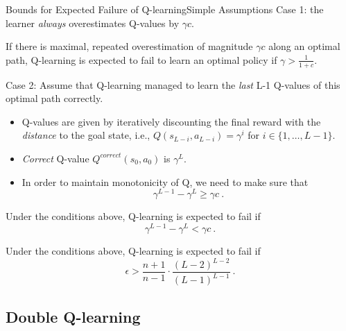 \documentclass{beamer}
\newcommand{\red}[1]{{\color{red} #1}}
\begin{document}
\begin{frame}{Bounds for Expected Failure of Q-learning}{Simple Assumptions}
Case 1: the learner \textit{always} overestimates Q-values by $\gamma c$.
\begin{Theorem}
	If there is maximal, repeated overestimation of magnitude $\gamma c$ along an optimal path, Q-learning is expected to fail to learn an optimal policy if $\gamma > \frac{1}{1+c}$.
\end{Theorem}
\end{frame}

\begin{frame}
Case 2: Assume that Q-learning managed to learn the \textit{last} L-1 Q-values of this optimal path correctly.

\begin{itemize}
	\item Q-values are given by iteratively discounting the final reward with the \textit{distance} to the goal state, i.e., \red{$Q(s_{L-i}, a_{L-i}) = \gamma^i$} for $i \in \{1,\ldots,L-1\}$.
	\item \textit{Correct} Q-value $Q^{correct}(s_0, a_0)$ is $\gamma^L$.
	
	\item In order to maintain monotonicity of Q, we need to make sure that
	\begin{equation}
	\gamma^{L-1} - \gamma^L \geq \gamma c ~.
	\end{equation}
\end{itemize}
\begin{theorem}
	Under the conditions above, Q-learning is expected to fail if
	\begin{equation}
		\gamma^{L-1} - \gamma^L < \gamma c ~.
	\end{equation}
\end{theorem}
\end{frame}

\begin{frame}
	\begin{theorem}
		Under the conditions above, Q-learning is expected to fail if
		\begin{equation}
			\epsilon > \frac{n+1}{n-1}\cdot \frac{(L-2)^{L-2}}{(L-1)^{L-1}} ~.
		\end{equation}
	\end{theorem}
\end{frame}

\subsection{Double Q-learning}
\end{document}
